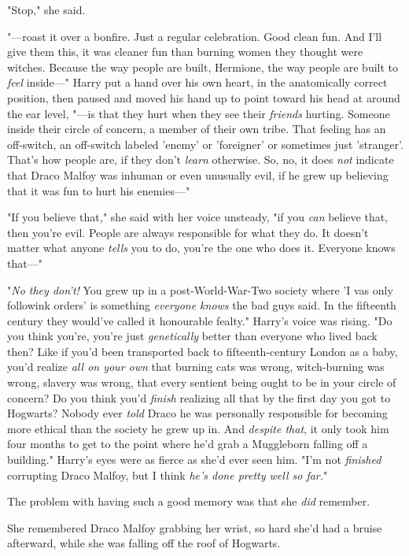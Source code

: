 "Stop," she said.

"---roast it over a bonfire. Just a regular celebration. Good clean fun. And 
I'll give them this, it was cleaner fun than burning women they thought were 
witches. Because the way people are built, Hermione, the way people are built 
to \emph{feel} inside---" Harry put a hand over his own heart, in the 
anatomically correct position, then paused and moved his hand up to point 
toward his head at around the ear level, "---is that they hurt when they see 
their \emph{friends} hurting. Someone inside their circle of concern, a member 
of their own tribe. That feeling has an off-switch, an off-switch labeled 
'enemy' or 'foreigner' or sometimes just 'stranger'. That's how people are, if 
they don't \emph{learn} otherwise. So, no, it does \emph{not} indicate that 
Draco Malfoy was inhuman or even unusually evil, if he grew up believing that 
it was fun to hurt his enemies---"

"If you believe that\emph{,}" she said with her voice unsteady, "if you 
\emph{can} believe that, then you're evil. People are always responsible for 
what they do. It doesn't matter what anyone \emph{tells} you to do, you're the 
one who does it. Everyone knows that---"

"\emph{No they don't!} You grew up in a post-World-War-Two society where 'I vas 
only followink orders' is something \emph{everyone knows} the bad guys said. In 
the fifteenth century they would've called it honourable fealty." Harry's voice 
was rising. "Do you think you're, you're just \emph{genetically} better than 
everyone who lived back then? Like if you'd been transported back to 
fifteenth-century London as a baby, you'd realize \emph{all on your own} that 
burning cats was wrong, witch-burning was wrong, slavery was wrong, that every 
sentient being ought to be in your circle of concern? Do you think you'd 
\emph{finish} realizing all that by the first day you got to Hogwarts? Nobody 
ever \emph{told} Draco he was personally responsible for becoming more ethical 
than the society he grew up in. And \emph{despite that}, it only took him four 
months to get to the point where he'd grab a Muggleborn falling off a 
building." Harry's eyes were as fierce as she'd ever seen him. "I'm not 
\emph{finished} corrupting Draco Malfoy, but I think \emph{he's done pretty 
well so far.}"

The problem with having such a good memory was that she \emph{did} remember.

She remembered Draco Malfoy grabbing her wrist, so hard she'd had a bruise 
afterward, while she was falling off the roof of Hogwarts.

